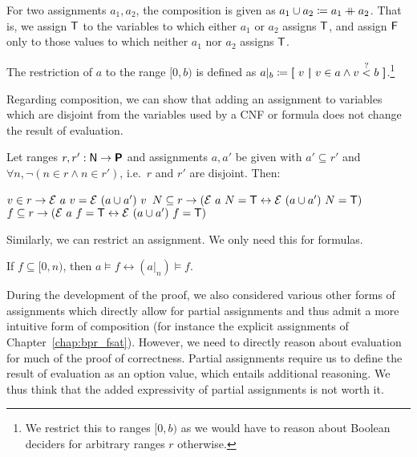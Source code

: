 \begin{definition}
  For two assignments $a_1, a_2$, the composition  is given as $a_1 \cup a_2 \coloneqq a_1 \mathbin{+\mkern-10mu+} a_2$. 
  That is, we assign $\mathsf{T}$ to the variables to which either $a_1$ or $a_2$ assigns $\mathsf{T}$, and assign $\mathsf{F}$ only to those values to which neither $a_1$ nor $a_2$ assigns $\mathsf{T}$.

  The restriction of $a$ to the range $[0, b)$ is defined as $a|_b \coloneqq \textbf{[}~ v ~\textbf{|}~ v \in a \land v \overset{?}{<} b ~\textbf{]}$.\footnote{We restrict this to ranges $[0, b)$ as we would have to reason about Boolean deciders for arbitrary ranges $r$ otherwise.} 
\end{definition}

Regarding composition, we can show that adding an assignment to variables which are disjoint from the variables used by a CNF or formula does not change the result of evaluation. 
\begin{proposition}\label{prop:eval_ext_assgn}
  Let ranges $r, r' : \mathsf{N} \rightarrow \textsf{\bfseries P}$ and assignments $a, a'$ be given with $a' \subseteq r'$ and $\forall n, \lnot (n \in r \land n \in r')$, i.e.\ $r$ and $r'$ are disjoint. Then:
  \begin{enumerate}
     $v \in r \rightarrow \mathcal{E}~a~v = \mathcal{E}~(a \cup a')~v$
     $N \subseteq r \rightarrow (\mathcal{E}~a~N = \mathsf{T} \leftrightarrow \mathcal{E}~(a \cup a')~N = \mathsf{T})$
     $f \subseteq r \rightarrow (\mathcal{E}~a~f = \mathsf{T} \leftrightarrow \mathcal{E}~(a \cup a')~f = \mathsf{T})$
  \end{enumerate}
\end{proposition}

Similarly, we can restrict an assignment. We only need this for formulas. 
\begin{proposition}\label{prop:eval_restrict}
  If $f \subseteq [0, n)$, then $a \models f \leftrightarrow (a|_n) \models f$.
\end{proposition}

\begin{remark}
  During the development of the proof, we also considered various other forms of assignments which directly allow for partial assignments and thus admit a more intuitive form of composition (for instance the explicit assignments of Chapter~\ref{chap:bpr_fsat}). 
  However, we need to directly reason about evaluation for much of the proof of correctness. Partial assignments require us to define the result of evaluation as an option value, which entails additional reasoning. 
  We thus think that the added expressivity of partial assignments is not worth it.
\end{remark}

